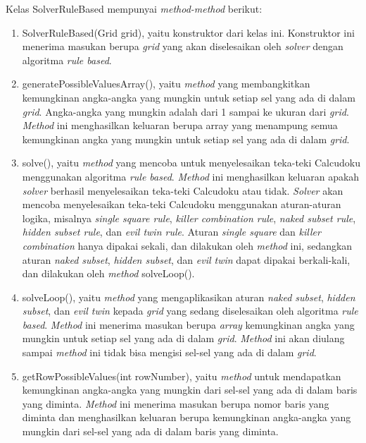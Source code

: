 Kelas SolverRuleBased mempunyai \textit{method-method} berikut:

\begin{enumerate}
\item SolverRuleBased(Grid grid), yaitu konstruktor dari kelas ini. Konstruktor ini menerima masukan berupa \textit{grid} yang akan diselesaikan oleh \textit{solver} dengan algoritma \textit{rule based}.
\item generatePossibleValuesArray(), yaitu \textit{method} yang membangkitkan kemungkinan angka-angka yang mungkin untuk setiap sel yang ada di dalam \textit{grid}. Angka-angka yang mungkin adalah dari 1 sampai ke ukuran dari \textit{grid}. \textit{Method} ini menghasilkan keluaran berupa array yang menampung semua kemungkinan angka yang mungkin untuk setiap sel yang ada di dalam \textit{grid}.
\item solve(), yaitu \textit{method} yang mencoba untuk menyelesaikan teka-teki Calcudoku menggunakan algoritma \textit{rule based}. \textit{Method} ini menghasilkan keluaran apakah \textit{solver} berhasil menyelesaikan teka-teki Calcudoku atau tidak. \textit{Solver} akan mencoba menyelesaikan teka-teki Calcudoku menggunakan aturan-aturan logika, misalnya \textit{single square rule}, \textit{killer combination rule}, \textit{naked subset rule}, \textit{hidden subset rule}, dan \textit{evil twin rule}. Aturan \textit{single square} dan \textit{killer combination} hanya dipakai sekali, dan dilakukan oleh \textit{method} ini, sedangkan aturan \textit{naked subset}, \textit{hidden subset}, dan \textit{evil twin} dapat dipakai berkali-kali, dan dilakukan oleh \textit{method} solveLoop().
\item solveLoop(), yaitu \textit{method} yang mengaplikasikan aturan \textit{naked subset}, \textit{hidden subset}, dan \textit{evil twin} kepada \textit{grid} yang sedang diselesaikan oleh algoritma \textit{rule based}. \textit{Method} ini menerima masukan berupa \textit{array} kemungkinan angka yang mungkin untuk setiap sel yang ada di dalam \textit{grid}. \textit{Method} ini akan diulang sampai \textit{method} ini tidak bisa mengisi sel-sel yang ada di dalam \textit{grid}.
\item getRowPossibleValues(int rowNumber), yaitu \textit{method} untuk mendapatkan kemungkinan angka-angka yang mungkin dari sel-sel yang ada di dalam baris yang diminta. \textit{Method} ini menerima masukan berupa nomor baris yang diminta dan menghasilkan keluaran berupa kemungkinan angka-angka yang mungkin dari sel-sel yang ada di dalam baris yang diminta.

\end{enumerate}
